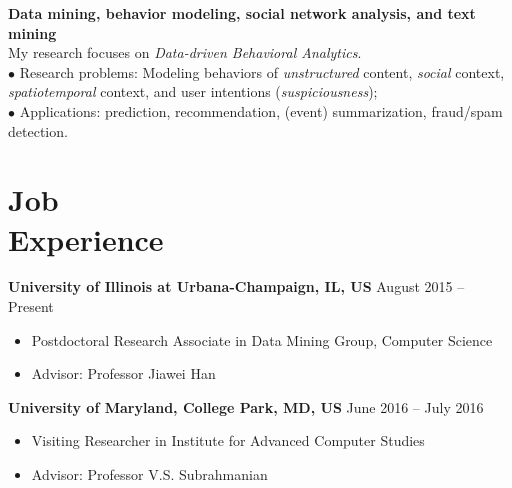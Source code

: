 \documentclass[margin, 10pt]{res}
\begin{document}
\begin{resume}
\textbf{Data mining, behavior modeling, social network analysis, and text mining} \\
My research focuses on \emph{Data-driven Behavioral Analytics}. \\
$\bullet$ {Research problems:} Modeling behaviors of \emph{unstructured} content, \emph{social} context, \emph{spatiotemporal} context, and user intentions (\emph{suspiciousness}); \\
$\bullet$ {Applications:} prediction, recommendation, (event) summarization, fraud/spam detection.


\section{Job \\ Experience}

\textbf{University of Illinois at Urbana-Champaign, IL, US} \hfill{August 2015 -- Present}
\begin{itemize} \itemsep -2pt
	\item Postdoctoral Research Associate in Data Mining Group, Computer Science
	\item Advisor: Professor Jiawei Han
\end{itemize}

\textbf{University of Maryland, College Park, MD, US} \hfill{June 2016 -- July 2016}
\begin{itemize} \itemsep -2pt
	\item Visiting Researcher in Institute for Advanced Computer Studies
	\item Advisor: Professor V.S. Subrahmanian
\end{itemize}


\end{resume}
\end{document}
